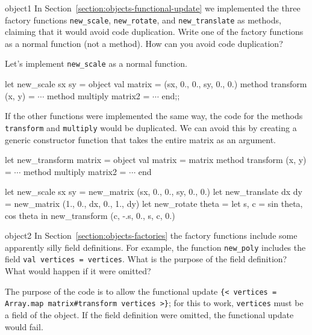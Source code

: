 \exercises

%
\begin{exercise}{object1}
In Section~\ref{section:objects-functional-update} we implemented the three factory
functions \hbox{\lstinline/new_scale/}, \hbox{\lstinline/new_rotate/}, and \hbox{\lstinline/new_translate/} as methods,
claiming that it would avoid code duplication.  Write one of the factory functions as a normal
function (not a method).  How can you avoid code duplication?

\begin{answer}\ifanswers
Let's implement \hbox{\lstinline/new_scale/} as a normal function.

\begin{ocaml}
let new_scale sx sy =
   object
      val matrix = (sx, 0., 0., sy, 0., 0.)
      method transform (x, y) = $\cdots$
      method multiply matrix2 = $\cdots$
   end;;
\end{ocaml}
%
If the other functions were implemented the same way, the code for the methods \hbox{\lstinline/transform/}
and \hbox{\lstinline/multiply/} would be duplicated.  We can avoid this by creating a generic constructor
function that takes the entire matrix as an argument.

\begin{ocaml}
let new_transform matrix =
   object
      val matrix = matrix
      method transform (x, y) = $\cdots$
      method multiply matrix2 = $\cdots$
   end

let new_scale sx sy = new_matrix (sx, 0., 0., sy, 0., 0.)
let new_translate dx dy = new_matrix (1., 0., dx, 0., 1., dy)
let new_rotate theta =
   let s, c = sin theta, cos theta in
   new_transform (c, -.s, 0., s, c, 0.)
\end{ocaml}
\fi\end{answer}
\end{exercise}

%
\begin{exercise}{object2}
In Section~\ref{section:objects-factories} the factory functions include some apparently silly field
definitions.  For example, the function \hbox{\lstinline/new_poly/} includes the field
\hbox{\lstinline/val vertices = vertices/}.
What is the purpose of the field definition?  What would happen if it were
omitted?

\begin{answer}\ifanswers
The purpose of the code is to allow the functional update
\hbox{\lstinline/{< vertices = Array.map matrix#transform vertices >}/};
for this to work, \hbox{\lstinline/vertices/} must be a field of the object.
If the field definition were omitted, the functional update would fail.
\fi\end{answer}
\end{exercise}

